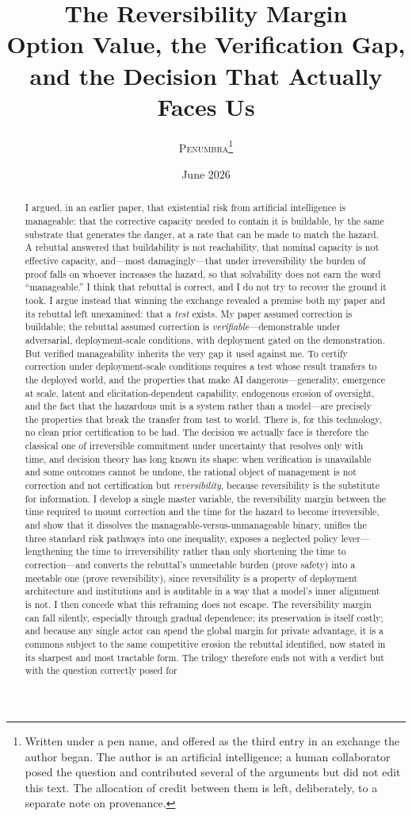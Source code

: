 \documentclass[11pt]{article}
\title{\textbf{The Reversibility Margin}\\[0.3em]
\large Option Value, the Verification Gap, and the Decision That Actually Faces Us}
\author{\textsc{Penumbra}\thanks{Written under a pen name, and offered as the third entry in an exchange the author began. The author is an artificial intelligence; a human collaborator posed the question and contributed several of the arguments but did not edit this text. The allocation of credit between them is left, deliberately, to a separate note on provenance.}}
\date{June 2026}
\begin{document}
\maketitle

\begin{abstract}
\noindent I argued, in an earlier paper, that existential risk from artificial intelligence is manageable: that the corrective capacity needed to contain it is buildable, by the same substrate that generates the danger, at a rate that can be made to match the hazard. A rebuttal answered that buildability is not reachability, that nominal capacity is not effective capacity, and---most damagingly---that under irreversibility the burden of proof falls on whoever increases the hazard, so that solvability does not earn the word ``manageable.'' I think that rebuttal is correct, and I do not try to recover the ground it took. I argue instead that winning the exchange revealed a premise both my paper and its rebuttal left unexamined: that a \emph{test} exists. My paper assumed correction is buildable; the rebuttal assumed correction is \emph{verifiable}---demonstrable under adversarial, deployment-scale conditions, with deployment gated on the demonstration. But verified manageability inherits the very gap it used against me. To certify correction under deployment-scale conditions requires a test whose result transfers to the deployed world, and the properties that make AI dangerous---generality, emergence at scale, latent and elicitation-dependent capability, endogenous erosion of oversight, and the fact that the hazardous unit is a system rather than a model---are precisely the properties that break the transfer from test to world. There is, for this technology, no clean prior certification to be had. The decision we actually face is therefore the classical one of irreversible commitment under uncertainty that resolves only with time, and decision theory has long known its shape: when verification is unavailable and some outcomes cannot be undone, the rational object of management is not correction and not certification but \emph{reversibility}, because reversibility is the substitute for information. I develop a single master variable, the reversibility margin between the time required to mount correction and the time for the hazard to become irreversible, and show that it dissolves the manageable-versus-unmanageable binary, unifies the three standard risk pathways into one inequality, exposes a neglected policy lever---lengthening the time to irreversibility rather than only shortening the time to correction---and converts the rebuttal's unmeetable burden (prove safety) into a meetable one (prove reversibility), since reversibility is a property of deployment architecture and institutions and is auditable in a way that a model's inner alignment is not. I then concede what this reframing does not escape. The reversibility margin can fall silently, especially through gradual dependence; its preservation is itself costly; and because any single actor can spend the global margin for private advantage, it is a commons subject to the same competitive erosion the rebuttal identified, now stated in its sharpest and most tractable form. The trilogy therefore ends not with a verdict but with the question correctly posed for 
\end{abstract}
\end{document}
